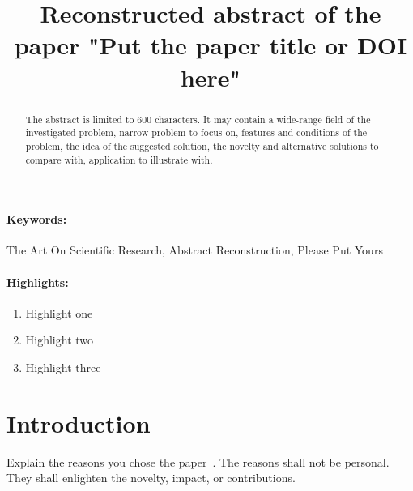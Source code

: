 \documentclass[12pt]{article}
\title{Reconstructed abstract of the paper "Put the paper title or DOI here"}
\date{}
\begin{document}
\maketitle

\begin{abstract}
The abstract is limited to 600 characters. It may contain a wide-range field of the investigated problem, narrow problem to focus on, features and conditions of the problem, the idea of the suggested solution, the novelty and alternative solutions to compare with, application to illustrate with.
\end{abstract}
\paragraph{Keywords:} The Art On Scientific Research, Abstract Reconstruction, Please Put Yours 

\paragraph{Highlights:}
\begin{enumerate}
\item Highlight one
\item Highlight two
\item Highlight three
\end{enumerate}

\section{Introduction}
Explain the reasons you chose the paper~\cite{9095246}. The reasons shall not be personal. They shall enlighten the novelty, impact, or contributions.  



\end{document}
